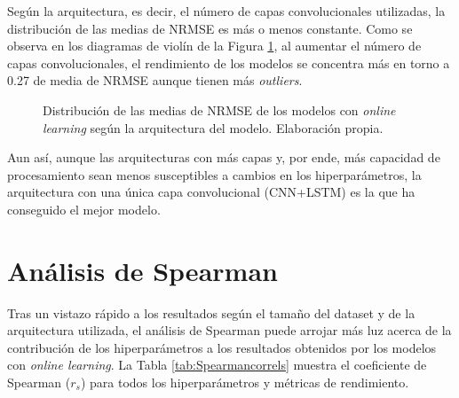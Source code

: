 Según la arquitectura, es decir, el número de capas convolucionales utilizadas, la distribución de las medias de NRMSE es más o menos constante. Como se observa en los diagramas de violín de la Figura \ref{fig:dist_nrmse_layers}, al aumentar el número de capas convolucionales, el rendimiento de los modelos se concentra más en torno a 0.27 de media de NRMSE aunque tienen más \textit{outliers}.

\begin{figure}[h!]
	\centering
	
	\caption{Distribución de las medias de NRMSE de los modelos con \textit{online learning} según la arquitectura del modelo. Elaboración propia.}
	\label{fig:dist_nrmse_layers}
\end{figure}
\FloatBarrier

Aun así, aunque las arquitecturas con más capas y, por ende, más capacidad de procesamiento sean menos susceptibles a cambios en los hiperparámetros, la arquitectura con una única capa convolucional (CNN+LSTM) es la que ha conseguido el mejor modelo.

\section{Análisis de Spearman}
Tras un vistazo rápido a los resultados según el tamaño del dataset y de la arquitectura utilizada, el análisis de Spearman puede arrojar más luz acerca de la contribución de los hiperparámetros a los resultados obtenidos por los modelos con \textit{online learning}. La Tabla \ref{tab:Spearmancorrels} muestra el coeficiente de Spearman ($r_s$) para todos los hiperparámetros y métricas de rendimiento.

